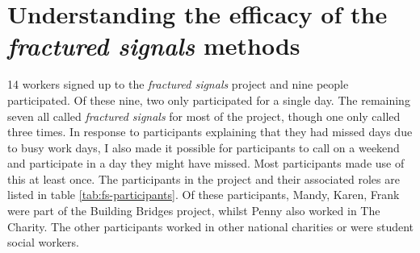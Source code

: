 \section{Understanding the efficacy of the \textit{fractured signals} methods}
14 workers signed up to the \textit{fractured signals} project and nine people participated. Of these nine, two only participated for a single day. The remaining seven all called \textit{fractured signals} for most of the project, though one only called three times. In response to participants explaining that they had missed days due to busy work days, I also made it possible for participants to call on a weekend and participate in a day they might have missed. Most participants made use of this at least once. The participants in the project and their associated roles are listed in table \ref{tab:fs-participants}. Of these participants, Mandy, Karen, Frank were part of the Building Bridges project, whilst Penny also worked in The Charity. The other participants worked in other national charities or were student social workers.

